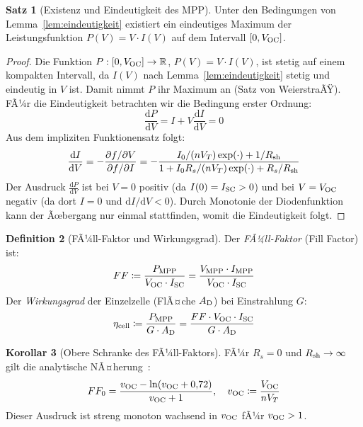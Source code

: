 ﻿\documentclass[a4paper,12pt]{article}
\theoremstyle{definition}
\newtheorem{definition}{Definition}[section]
\newtheorem{korollar}[definition]{Korollar}
\newtheorem{satz}[definition]{Satz}
\theoremstyle{remark}
\newcommand{\R}{\mathbb{R}}
\newcommand{\diff}{\mathrm{d}}
\begin{document}
\begin{satz}[Existenz und Eindeutigkeit des MPP]
\label{satz:mpp}
Unter den Bedingungen von Lemma~\ref{lem:eindeutigkeit} existiert ein eindeutiges
Maximum der Leistungsfunktion $P(V) = V \cdot I(V)$ auf dem Intervall
$[0, V_{\rm OC}]$.
\end{satz}

\begin{proof}
Die Funktion $P: [0, V_{\rm OC}] \to \R$, $P(V) = V \cdot I(V)$, ist
stetig auf einem kompakten Intervall, da $I(V)$ nach Lemma~\ref{lem:eindeutigkeit}
stetig und eindeutig in $V$ ist. Damit nimmt $P$ ihr Maximum an (Satz von
WeierstraÃŸ). FÃ¼r die Eindeutigkeit betrachten wir die Bedingung erster Ordnung:
\begin{equation}
  \frac{\diff P}{\diff V} = I + V \frac{\diff I}{\diff V} = 0
  \label{eq:mpp_bed}
\end{equation}
Aus dem impliziten Funktionensatz folgt:
\begin{equation}
  \frac{\diff I}{\diff V} = -\frac{\partial f/\partial V}{\partial f/\partial I}
  = -\frac{I_0/(nV_T)\exp(\cdot) + 1/R_{\rm sh}}{1 + I_0 R_s/(nV_T)\exp(\cdot) + R_s/R_{\rm sh}}
  \label{eq:didv}
\end{equation}
Der Ausdruck $\frac{\diff P}{\diff V}$ ist bei $V=0$ positiv (da $I(0) = I_{\rm SC} > 0$)
und bei $V = V_{\rm OC}$ negativ (da dort $I = 0$ und $\diff I/\diff V < 0$).
Durch Monotonie der Diodenfunktion kann der Ãœbergang nur einmal stattfinden,
womit die Eindeutigkeit folgt.
\end{proof}

\begin{definition}[FÃ¼ll-Faktor und Wirkungsgrad]
\label{def:ff}
Der \emph{FÃ¼ll-Faktor} (Fill Factor) ist:
\begin{equation}
  FF \coloneqq \frac{P_{\rm MPP}}{V_{\rm OC} \cdot I_{\rm SC}}
              = \frac{V_{\rm MPP} \cdot I_{\rm MPP}}{V_{\rm OC} \cdot I_{\rm SC}}
  \label{eq:ff}
\end{equation}
Der \emph{Wirkungsgrad} der Einzelzelle (FlÃ¤che $A_{\rm D}$) bei Einstrahlung $G$:
\begin{equation}
  \eta_{\rm cell} \coloneqq \frac{P_{\rm MPP}}{G \cdot A_{\rm D}}
                           = \frac{FF \cdot V_{\rm OC} \cdot I_{\rm SC}}{G \cdot A_{\rm D}}
  \label{eq:eta}
\end{equation}
\end{definition}

\begin{korollar}[Obere Schranke des FÃ¼ll-Faktors]
\label{kor:ff}
FÃ¼r $R_s = 0$ und $R_{\rm sh} \to \infty$ gilt die analytische NÃ¤herung~\cite{Green1982}:
\begin{equation}
  FF_0 = \frac{v_{\rm OC} - \ln(v_{\rm OC} + 0{,}72)}{v_{\rm OC} + 1},
  \quad v_{\rm OC} \coloneqq \frac{V_{\rm OC}}{nV_T}
  \label{eq:ff0}
\end{equation}
Dieser Ausdruck ist streng monoton wachsend in $v_{\rm OC}$ fÃ¼r $v_{\rm OC} > 1$.
\end{korollar}
\end{document}
